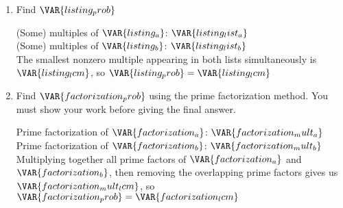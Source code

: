 
\begin{enumerate}

    \item Find $\VAR{listing_prob}$ 

    \vfill

    \begin{ansenv}
        (Some) multiples of $\VAR{listing_a}$: $\VAR{listing_list_a}$\\

        (Some) multiples of $\VAR{listing_b}$: $\VAR{listing_list_b}$\\

        The smallest nonzero multiple appearing in both lists simultaneously is $\VAR{listing_lcm}$, so $\VAR{listing_prob} = \VAR{listing_lcm}$
    \end{ansenv}

    \vfill

    \item Find $\VAR{factorization_prob}$ using the prime factorization method. You must show your work before giving the final answer.

    \vfill

    \begin{ansenv}
        Prime factorization of $\VAR{factorization_a}$: $\VAR{factorization_mult_a}$\\

        Prime factorization of $\VAR{factorization_b}$: $\VAR{factorization_mult_b}$\\

        Multiplying together all prime factors of $\VAR{factorization_a}$ and $\VAR{factorization_b}$, then removing the overlapping prime factors gives us $\VAR{factorization_mult_lcm}$, so $\VAR{factorization_prob} = \VAR{factorization_lcm}$
    \end{ansenv}

    \vfill

\end{enumerate}

\trueemptypage